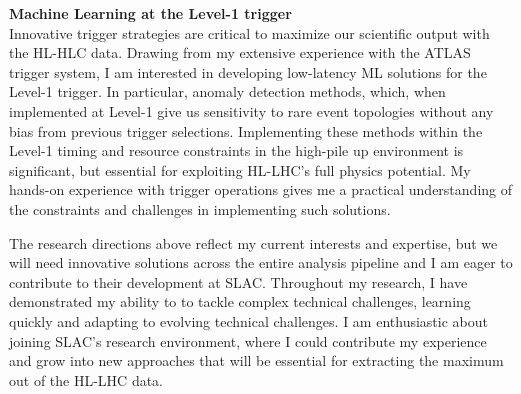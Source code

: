 \documentclass[11pt, a4paper]{awesome-cv}
\begin{document}
\begin{cvletter}
\textbf{Machine Learning at the Level-1 trigger}\\
Innovative trigger strategies are critical to maximize our scientific output with the HL-HLC data. Drawing from my extensive experience with the ATLAS trigger system, I am interested in developing low-latency ML solutions for the Level-1 trigger. In particular, anomaly detection methods, which, when implemented at Level-1 give us sensitivity to rare event topologies without any bias from previous trigger selections. Implementing these methods within the Level-1 timing and resource constraints in the high-pile up environment is significant, but essential for exploiting HL-LHC's full physics potential. My hands-on experience with trigger operations gives me a practical understanding of the constraints and challenges in implementing such solutions.

The research directions above reflect my current interests and expertise, but we will need innovative solutions across the entire analysis pipeline and I am eager to contribute to their development at SLAC. Throughout my research, I have demonstrated my ability to to tackle complex technical challenges, learning quickly and adapting to evolving technical challenges. I am enthusiastic about joining SLAC's research environment, where I could contribute my experience and grow into new approaches that will be essential for extracting the maximum out of the HL-LHC data.

\end{cvletter}

\makeletterclosing
\end{document}
